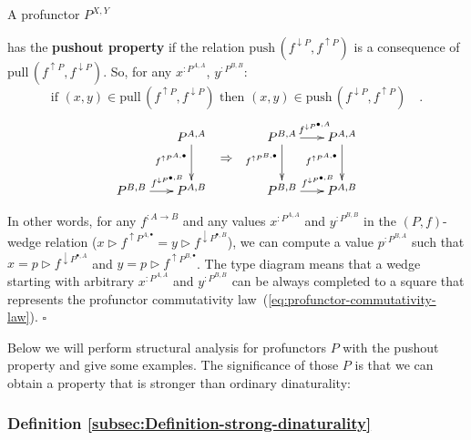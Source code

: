 A profunctor $P^{X,Y}$ %
\begin{comment}
empty arrow
\end{comment}
{} has the \textbf{pushout property}
if the relation $\text{push}\,(f^{\downarrow P},f^{\uparrow P})$
is a consequence of $\text{pull}\,(f^{\uparrow P},f^{\downarrow P})$.
So, for any $x^{:P^{A,A}}$, $y^{:P^{B,B}}$:
\[
\text{if }(x,y)\in\text{pull}\,(f^{\uparrow P},f^{\downarrow P})\text{ then }(x,y)\in\text{push}\,(f^{\downarrow P},f^{\uparrow P})\quad.
\]
\[
\xymatrix{\xyScaleY{2.3pc}\xyScaleX{1.5pc} & P^{A,A}\ar[d]\sb(0.4){f^{\uparrow P^{A,\bullet}}} & \ar@{}[d]\sb(0.4){\displaystyle \Rightarrow} & P^{B,A}\ar[r]\sp(0.55){f^{\downarrow P^{\bullet,A}}}\ar[d]\sb(0.4){f^{\uparrow P^{B,\bullet}}} & P^{A,A}\ar[d]\sb(0.4){f^{\uparrow P^{A,\bullet}}}\\
P^{B,B}\ar[r]\sp(0.6){f^{\downarrow P^{\bullet,B}}} & P^{A,B} &  & P^{B,B}\ar[r]\sp(0.6){f^{\downarrow P^{\bullet,B}}} & P^{A,B}
}
\]

\noindent In other words, for any $f^{:A\rightarrow B}$ and any values
$x^{:P^{A,A}}$ and $y^{:P^{B,B}}$ in the $\left(P,f\right)$-wedge
relation ($x\triangleright f^{\uparrow P^{A,\bullet}}=y\triangleright f^{\downarrow P^{\bullet,B}}$),
we can compute a value $p^{:P^{B,A}}$ such that $x=p\triangleright f^{\downarrow P^{\bullet,A}}$
and $y=p\triangleright f^{\uparrow P^{B,\bullet}}$. The type diagram
means that a wedge starting with arbitrary $x^{:P^{A,A}}$ and $y^{:P^{B,B}}$
can be always completed to a square that represents the profunctor
commutativity law~(\ref{eq:profunctor-commutativity-law}). $\square$

Below we will perform structural analysis for profunctors $P$ with
the pushout property and give some examples. The significance of those
$P$ is that we can obtain a property that is stronger than ordinary
dinaturality:

\subsubsection{Definition \label{subsec:Definition-strong-dinaturality}\ref{subsec:Definition-strong-dinaturality}}

